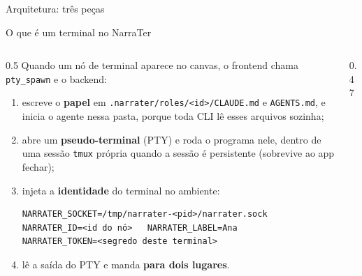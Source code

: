\documentclass[11pt,aspectratio=169]{beamer}
\begin{document}
\begin{frame}{Arquitetura: três peças}
\end{frame}

\begin{frame}[fragile]{O que é um terminal no NarraTer}
\begin{columns}[T]
\begin{column}{0.5\linewidth}
\footnotesize
Quando um nó de terminal aparece no canvas, o frontend chama \texttt{pty\_spawn} e o backend:
\begin{enumerate}\setlength\itemsep{0.3em}
\item escreve o \textbf{papel} em \texttt{.narrater/roles/<id>/CLAUDE.md} e \texttt{AGENTS.md}, e inicia o agente
  nessa pasta, porque toda CLI lê esses arquivos sozinha;
\item abre um \textbf{pseudo-terminal} (PTY) e roda o programa nele, dentro de uma sessão \texttt{tmux} própria
  quando a sessão é persistente (sobrevive ao app fechar);
\item injeta a \textbf{identidade} do terminal no ambiente:
\begin{lstlisting}[basicstyle=\ttfamily\tiny, breaklines=false]
NARRATER_SOCKET=/tmp/narrater-<pid>/narrater.sock
NARRATER_ID=<id do nó>   NARRATER_LABEL=Ana
NARRATER_TOKEN=<segredo deste terminal>
\end{lstlisting}
\item lê a saída do PTY e manda \textbf{para dois lugares}.
\end{enumerate}
\end{column}
\begin{column}{0.47\linewidth}
\centering
{}
\end{column}
\end{columns}
\end{frame}
\end{document}
